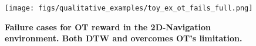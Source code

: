 \begin{figure}
    \centering
    \texttt{[image: figs/qualitative\_examples/toy\_ex\_ot\_fails\_full.png]}
        \caption{\small \textbf{Failure cases for OT reward in the 2D-Navigation environment. Both DTW and \orca{} overcomes OT's limitation.} }
    \label{fig:ot_fail_full}
\end{figure}
